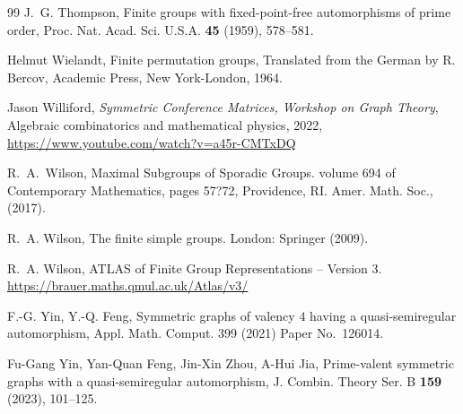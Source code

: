 \documentclass{article}
\theoremstyle{remark}
\theoremstyle{definition}
\begin{document}
\begin{thebibliography}{99}
J.~G. Thompson, Finite groups with fixed-point-free automorphisms of prime order, Proc. Nat. Acad. Sci. U.S.A. {\bf 45} (1959), 578--581.

Helmut Wielandt, Finite permutation groups, Translated from the German by R. Bercov, Academic Press, New York-London, 1964.

Jason Williford, \emph{Symmetric Conference Matrices, Workshop on Graph Theory}, Algebraic combinatorics and mathematical physics, 2022, \url{https://www.youtube.com/watch?v=a45r-CMTxDQ}

R.~A.~Wilson, Maximal Subgroups of Sporadic Groups. volume 694 of Contemporary Mathematics, pages 57?72, Providence, RI. Amer. Math. Soc., (2017).

R.~A. Wilson, The finite simple groups. London: Springer (2009).

R.~A. Wilson, ATLAS of Finite Group Representations -- Version 3. \url{https://brauer.maths.qmul.ac.uk/Atlas/v3/}


F.-G. Yin, Y.-Q. Feng,  Symmetric graphs of valency  {$4$} having a quasi-semiregular automorphism, Appl. Math. Comput. 399 (2021) Paper No.~126014.

Fu-Gang Yin,  Yan-Quan Feng,  Jin-Xin Zhou,    A-Hui Jia, Prime-valent symmetric graphs with a quasi-semiregular automorphism, J. Combin. Theory Ser. B {\bf 159} (2023), 101--125.









\end{thebibliography}
\end{document}
